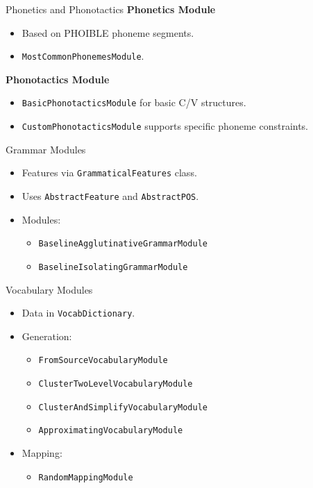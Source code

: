 \documentclass{beamer}
\begin{document}
\begin{frame}{Phonetics and Phonotactics}
	\textbf{Phonetics Module}
	\begin{itemize}
		\item Based on PHOIBLE phoneme segments.
		\item \texttt{MostCommonPhonemesModule}.
	\end{itemize}
	\textbf{Phonotactics Module}
	\begin{itemize}
		\item \texttt{BasicPhonotacticsModule} for basic C/V structures.
		\item \texttt{CustomPhonotacticsModule} supports specific phoneme constraints.
	\end{itemize}
\end{frame}

\begin{frame}{Grammar Modules}
	\begin{itemize}
		\item Features via \texttt{GrammaticalFeatures} class.
		\item Uses \texttt{AbstractFeature} and \texttt{AbstractPOS}.
		\item Modules:
		\begin{itemize}
			\item \texttt{BaselineAgglutinativeGrammarModule}
			\item \texttt{BaselineIsolatingGrammarModule}
		\end{itemize}
	\end{itemize}
\end{frame}

\begin{frame}{Vocabulary Modules}
	\begin{itemize}
		\item Data in \texttt{VocabDictionary}.
		\item Generation:
		\begin{itemize}
			\item \texttt{FromSourceVocabularyModule}
			\item \texttt{ClusterTwoLevelVocabularyModule}
			\item \texttt{ClusterAndSimplifyVocabularyModule}
			\item \texttt{ApproximatingVocabularyModule}
		\end{itemize}
		\item Mapping:
		\begin{itemize}
			\item \texttt{RandomMappingModule}
		\end{itemize}
	\end{itemize}
\end{frame}
\end{document}
